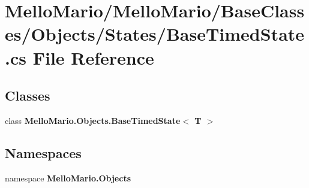 \section{Mello\+Mario/\+Mello\+Mario/\+Base\+Classes/\+Objects/\+States/\+Base\+Timed\+State.cs File Reference}
\label{BaseTimedState_8cs}
\subsection*{Classes}
\begin{DoxyCompactItemize}
\item 
class \textbf{ Mello\+Mario.\+Objects.\+Base\+Timed\+State$<$ T $>$}
\end{DoxyCompactItemize}
\subsection*{Namespaces}
\begin{DoxyCompactItemize}
\item 
namespace \textbf{ Mello\+Mario.\+Objects}
\end{DoxyCompactItemize}
